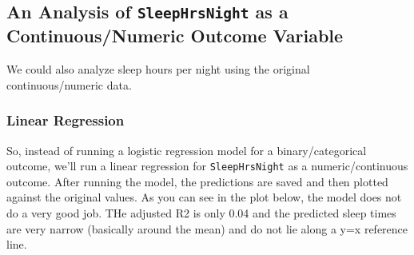 \documentclass[]{article}
\newenvironment{Shaded}{\begin{snugshade}}{\end{snugshade}}
\newcommand{\KeywordTok}[1]{\textcolor[rgb]{0.13,0.29,0.53}{\textbf{{#1}}}}
\newcommand{\StringTok}[1]{\textcolor[rgb]{0.31,0.60,0.02}{{#1}}}
\newcommand{\CommentTok}[1]{\textcolor[rgb]{0.56,0.35,0.01}{\textit{{#1}}}}
\newcommand{\NormalTok}[1]{{#1}}
\begin{document}
\subsection{\texorpdfstring{An Analysis of \texttt{SleepHrsNight} as a
Continuous/Numeric Outcome
Variable}{An Analysis of SleepHrsNight as a Continuous/Numeric Outcome Variable}}\label{an-analysis-of-sleephrsnight-as-a-continuousnumeric-outcome-variable}

We could also analyze sleep hours per night using the original
continuous/numeric data.

\subsubsection{Linear Regression}\label{linear-regression}

So, instead of running a logistic regression model for a
binary/categorical outcome, we'll run a linear regression for
\texttt{SleepHrsNight} as a numeric/continuous outcome. After running
the model, the predictions are saved and then plotted against the
original values. As you can see in the plot below, the model does not do
a very good job. THe adjusted R2 is only 0.04 and the predicted sleep
times are very narrow (basically around the mean) and do not lie along a
y=x reference line.

\begin{Shaded}
\end{Shaded}
\end{document}
